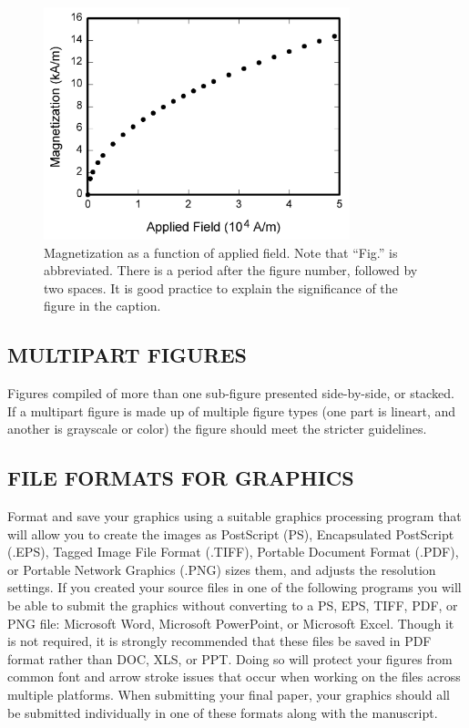 \documentclass{IEEEoj}
\begin{document}
\begin{figure}
\centerline{\includegraphics[width=3.5in]{fig1}}
\caption{Magnetization as a function of applied field. Note that ``Fig.'' 
is abbreviated. There is a period after the figure number, followed by two 
spaces. It is good practice to explain the significance of the figure in the 
caption.\label{fig1}}
\end{figure}

\subsection{MULTIPART FIGURES}
Figures compiled of more than one sub-figure presented side-by-side, or 
stacked. If a multipart figure is made up of multiple figure types (one part 
is lineart, and another is grayscale or color) the figure should meet the 
stricter guidelines.

\subsection{FILE FORMATS FOR GRAPHICS}
Format and save your graphics using a suitable graphics processing program 
that will allow you to create the images as PostScript (PS), Encapsulated 
PostScript (.EPS), Tagged Image File Format (.TIFF), Portable Document 
Format (.PDF), or Portable Network Graphics (.PNG) sizes them, and adjusts 
the resolution settings. If you created your source files in one of the 
following programs you will be able to submit the graphics without 
converting to a PS, EPS, TIFF, PDF, or PNG file: Microsoft Word, Microsoft 
PowerPoint, or Microsoft Excel. Though it is not required, it is strongly 
recommended that these files be saved in PDF format rather than DOC, XLS, or 
PPT. Doing so will protect your figures from common font and arrow stroke 
issues that occur when working on the files across multiple platforms. When 
submitting your final paper, your graphics should all be submitted 
individually in one of these formats along with the manuscript.
\end{document}
